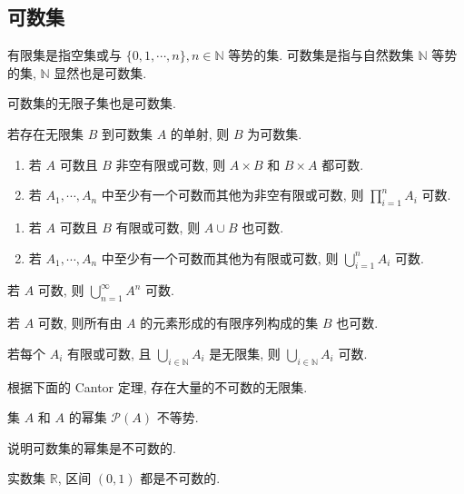 \documentclass[
    color=black,
    device=normal,
    lang=cn
]{elegantnote}
\begin{document}
\subsection{可数集}
\begin{definition}
    有限集是指空集或与 $\{0,1,\cdots,n\}, n\in \mathbb{N}$ 等势的集.
    可数集是指与自然数集 $\mathbb{N}$ 等势的集, $\mathbb{N}$ 显然也是可数集.
\end{definition}
\begin{proposition}
    可数集的无限子集也是可数集.
\end{proposition}
\begin{proposition}
    若存在无限集 $B$ 到可数集 $A$ 的单射, 则 $B$ 为可数集.
\end{proposition}
\begin{proposition}
    \begin{enumerate}[label=$\arabic*^\circ$]
        \item 若 $A$ 可数且 $B$ 非空有限或可数, 则 $A\times B$ 和 $B\times A$ 都可数.
        \item 若 $A_1, \cdots, A_n$ 中至少有一个可数而其他为非空有限或可数, 则 $\prod_{i = 1}^n A_i$ 可数.
    \end{enumerate}
\end{proposition}
\begin{proposition}
    \begin{enumerate}[label=$\arabic*^\circ$]
        \item 若 $A$ 可数且 $B$ 有限或可数, 则 $A\cup B$ 也可数.
        \item 若 $A_1, \cdots, A_n$ 中至少有一个可数而其他为有限或可数, 则 $\bigcup_{i = 1}^n A_i$ 可数.
    \end{enumerate}
\end{proposition}
\begin{proposition}
    若 $A$ 可数, 则 $\bigcup_{n=1}^{\infty}A^n$ 可数.
\end{proposition}
\begin{proposition}
    若 $A$ 可数, 则所有由 $A$ 的元素形成的有限序列构成的集 $B$ 也可数.
\end{proposition}
\begin{proposition}
    若每个 $A_i$ 有限或可数, 且 $\bigcup_{i\in\mathbb{N}}A_i$ 是无限集, 则 $\bigcup_{i\in\mathbb{N}}A_i$ 可数.
\end{proposition}
根据下面的 Cantor 定理, 存在大量的不可数的无限集.
\begin{theorem}
    集 $A$ 和 $A$ 的幂集 $\mathcal{P}(A)$ 不等势.
\end{theorem}
说明可数集的幂集是不可数的.
\begin{example}
    实数集 $\mathbb{R}$, 区间 $(0,1)$ 都是不可数的.
\end{example}
\newpage
\end{document}
